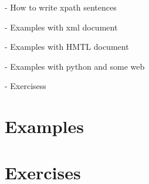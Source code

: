- How to write xpath sentences

- Examples with xml document

- Examples with HMTL document

- Examples with python and some web

- Exercisess

\section{Examples}

\section{Exercises}